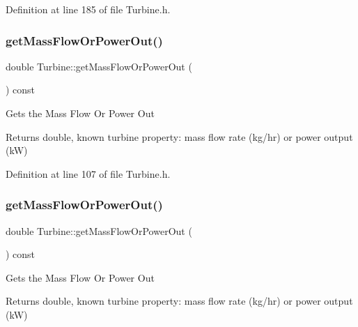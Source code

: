 Definition at line 185 of file Turbine.\+h.

\mbox{\label{class_turbine_a820a090d264b96ee84f717555545c287}} 
\subsubsection{\texorpdfstring{get\+Mass\+Flow\+Or\+Power\+Out()}{getMassFlowOrPowerOut()}\hspace{0.1cm}{\footnotesize\ttfamily [1/3]}}
{\footnotesize\ttfamily double Turbine\+::get\+Mass\+Flow\+Or\+Power\+Out (\begin{DoxyParamCaption}{ }\end{DoxyParamCaption}) const\hspace{0.3cm}{\ttfamily [inline]}}

Gets the Mass Flow Or Power Out

\begin{DoxyReturn}{Returns}
double, known turbine property\+: mass flow rate (kg/hr) or power output (kW) 
\end{DoxyReturn}


Definition at line 107 of file Turbine.\+h.

\mbox{\label{class_turbine_a820a090d264b96ee84f717555545c287}} 
\subsubsection{\texorpdfstring{get\+Mass\+Flow\+Or\+Power\+Out()}{getMassFlowOrPowerOut()}\hspace{0.1cm}{\footnotesize\ttfamily [2/3]}}
{\footnotesize\ttfamily double Turbine\+::get\+Mass\+Flow\+Or\+Power\+Out (\begin{DoxyParamCaption}{ }\end{DoxyParamCaption}) const\hspace{0.3cm}{\ttfamily [inline]}}

Gets the Mass Flow Or Power Out

\begin{DoxyReturn}{Returns}
double, known turbine property\+: mass flow rate (kg/hr) or power output (kW) 
\end{DoxyReturn}


